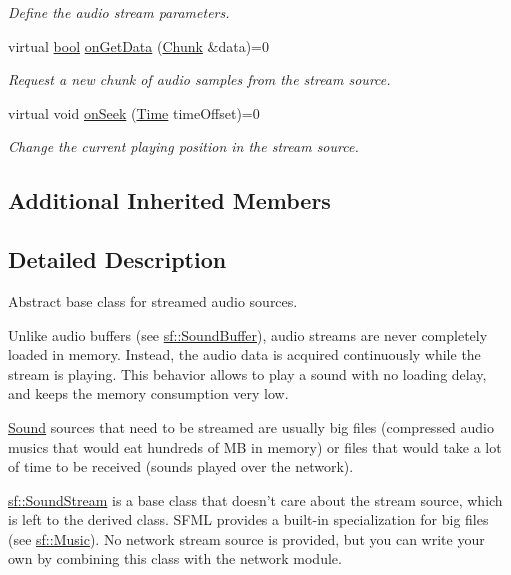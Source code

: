 \begin{DoxyCompactItemize}
\begin{DoxyCompactList}\small\item\em Define the audio stream parameters. \end{DoxyCompactList}\item 
virtual \hyperlink{term__entry_8h_a002004ba5d663f149f6c38064926abac}{bool} \hyperlink{classsf_1_1_sound_stream_a968ec024a6e45490962c8a1121cb7c5f}{on\-Get\-Data} (\hyperlink{structsf_1_1_sound_stream_1_1_chunk}{Chunk} \&data)=0
\begin{DoxyCompactList}\small\item\em Request a new chunk of audio samples from the stream source. \end{DoxyCompactList}\item 
virtual void \hyperlink{classsf_1_1_sound_stream_a907036dd2ca7d3af5ead316e54b75997}{on\-Seek} (\hyperlink{classsf_1_1_time}{Time} time\-Offset)=0
\begin{DoxyCompactList}\small\item\em Change the current playing position in the stream source. \end{DoxyCompactList}\end{DoxyCompactItemize}
\subsection*{Additional Inherited Members}


\subsection{Detailed Description}
Abstract base class for streamed audio sources. 

Unlike audio buffers (see \hyperlink{classsf_1_1_sound_buffer}{sf\-::\-Sound\-Buffer}), audio streams are never completely loaded in memory. Instead, the audio data is acquired continuously while the stream is playing. This behavior allows to play a sound with no loading delay, and keeps the memory consumption very low.

\hyperlink{classsf_1_1_sound}{Sound} sources that need to be streamed are usually big files (compressed audio musics that would eat hundreds of M\-B in memory) or files that would take a lot of time to be received (sounds played over the network).

\hyperlink{classsf_1_1_sound_stream}{sf\-::\-Sound\-Stream} is a base class that doesn't care about the stream source, which is left to the derived class. S\-F\-M\-L provides a built-\/in specialization for big files (see \hyperlink{classsf_1_1_music}{sf\-::\-Music}). No network stream source is provided, but you can write your own by combining this class with the network module.

